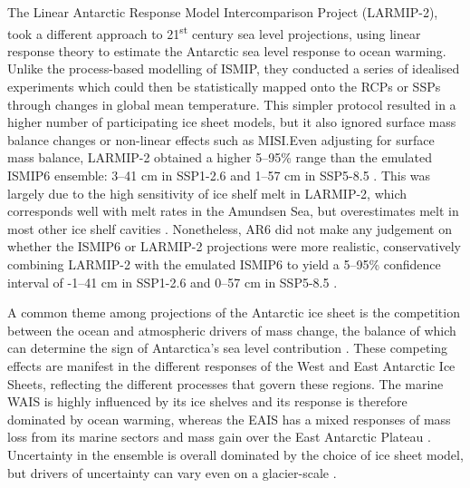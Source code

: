 The Linear Antarctic Response Model Intercomparison Project (LARMIP-2), took a different approach to 21\textsuperscript{st} century sea level projections, using linear response theory to estimate the Antarctic sea level response to ocean warming. Unlike the process-based modelling of ISMIP, they conducted a series of idealised experiments which could then be statistically mapped onto the RCPs \citep{levermannProjectingAntarcticasContribution2020} or SSPs \citep{fox-kemperOceanCryosphereSea2021} through changes in global mean temperature. This simpler protocol resulted in a higher number of participating ice sheet models, but it also ignored surface mass balance changes or non-linear effects such as MISI.\@ Even adjusting for surface mass balance, LARMIP-2 obtained a higher 5--95\% range than the emulated ISMIP6 ensemble: 3--41 cm in SSP1-2.6 and 1--57 cm in SSP5-8.5 \citep{fox-kemperOceanCryosphereSea2021}. This was largely due to the high sensitivity of ice shelf melt in LARMIP-2, which corresponds well with melt rates in the Amundsen Sea, but overestimates melt in most other ice shelf cavities \citep{reeseRoleHistoryStrength2020}. Nonetheless, AR6 did not make any judgement on whether the ISMIP6 or LARMIP-2 projections were more realistic, conservatively combining LARMIP-2 with the emulated ISMIP6 to yield a 5--95\% confidence interval of -1--41 cm in SSP1-2.6 and 0--57 cm in SSP5-8.5 \citep{fox-kemperOceanCryosphereSea2021}.

A common theme among projections of the Antarctic ice sheet is the competition between the ocean and atmospheric drivers of mass change, the balance of which can determine the sign of Antarctica's sea level contribution \citep{seroussiISMIP6AntarcticaMultimodel2020,edwardsProjectedLandIce2021}. These competing effects are manifest in the different responses of the West and East Antarctic Ice Sheets, reflecting the different processes that govern these regions. The marine WAIS is highly influenced by its ice shelves and its response is therefore dominated by ocean warming, whereas the EAIS has a mixed responses of mass loss from its marine sectors and mass gain over the East Antarctic Plateau \citep{seroussiISMIP6AntarcticaMultimodel2020,seroussiInsightsVulnerabilityAntarctic2023,oneillISMIP6basedAntarcticProjections2025}. Uncertainty in the ensemble is overall dominated by the choice of ice sheet model, but drivers of uncertainty can vary even on a glacier-scale \citep{seroussiInsightsVulnerabilityAntarctic2023}.

